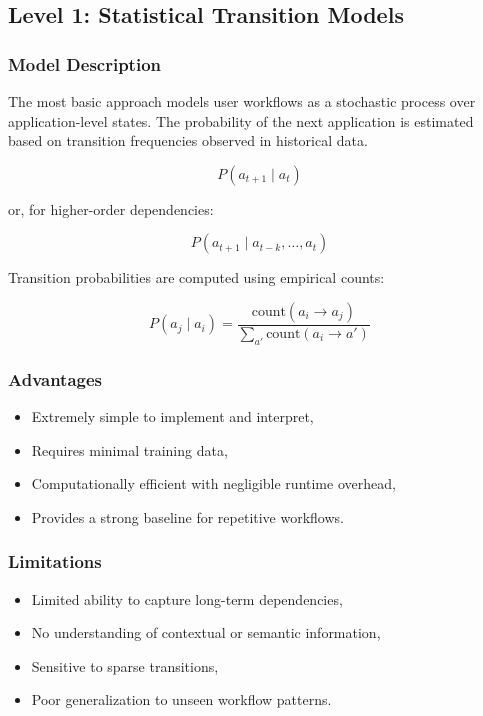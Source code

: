 \documentclass[11pt]{article}
\begin{document}
\subsection{Level 1: Statistical Transition Models}

\subsubsection{Model Description}

The most basic approach models user workflows as a stochastic process over application-level states. The probability of the next application is estimated based on transition frequencies observed in historical data.

\[
P(a_{t+1} \mid a_t)
\]

or, for higher-order dependencies:

\[
P(a_{t+1} \mid a_{t-k}, \dots, a_t)
\]

Transition probabilities are computed using empirical counts:

\[
P(a_j \mid a_i) = \frac{\text{count}(a_i \rightarrow a_j)}{\sum_{a'} \text{count}(a_i \rightarrow a')}
\]

\subsubsection{Advantages}

\begin{itemize}
\item Extremely simple to implement and interpret,
\item Requires minimal training data,
\item Computationally efficient with negligible runtime overhead,
\item Provides a strong baseline for repetitive workflows.
\end{itemize}

\subsubsection{Limitations}

\begin{itemize}
\item Limited ability to capture long-term dependencies,
\item No understanding of contextual or semantic information,
\item Sensitive to sparse transitions,
\item Poor generalization to unseen workflow patterns.
\end{itemize}
\end{document}
